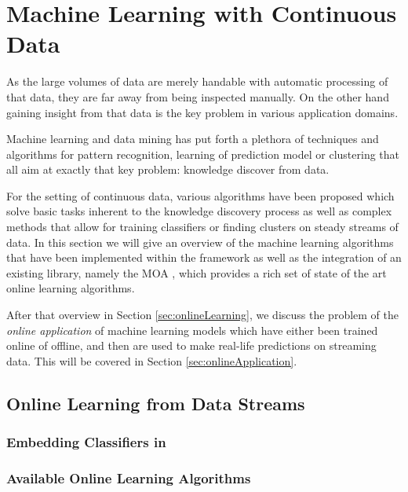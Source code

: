 \section{\label{sec:machineLearning}Machine Learning with Continuous Data}
As the large volumes of data are merely handable with automatic
processing of that data, they are far away from being inspected
manually. On the other hand gaining insight from that data is the key
problem in various application domains.

Machine learning and data mining has put forth a plethora of
techniques and algorithms for pattern recognition, learning of
prediction model or clustering that all aim at exactly that key
problem: knowledge discover from data.

For the setting of continuous data, various algorithms have been
proposed which solve basic tasks inherent to the knowledge discovery
process as well as complex methods that allow for training classifiers
or finding clusters on steady streams of data. In this section we will
give an overview of the machine learning algorithms that have been
implemented within the \streams framework as well as the integration
of an existing library, namely the MOA \cite{MOA}, which provides a
rich set of state of the art online learning algorithms. 

After that overview in Section \ref{sec:onlineLearning}, we discuss
the problem of the {\em online application} of machine learning models
which have either been trained online of offline, and then are used to
make real-life predictions on streaming data. This will be covered in
Section \ref{sec:onlineApplication}.


\subsection{\label{sec:onlineLearning}Online Learning from Data Streams}


\subsubsection{Embedding Classifiers in \streams}


\subsubsection{Available Online Learning Algorithms}

